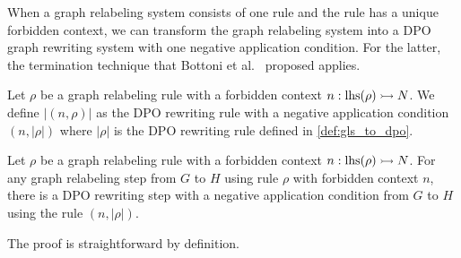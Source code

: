 When a graph relabeling system consists of one rule and the rule has a unique forbidden context, we can transform the graph relabeling system into a DPO graph rewriting system with one negative application condition. For the latter, the termination technique that Bottoni et al.~\cite{bottoni2010atermination} proposed applies. 
\begin{definition}
    Let $\rho$ be a graph relabeling rule with a forbidden context $n:\operatorname{lhs}(\rho) \rightarrowtail N$.
      We define $|(n,\rho)|$ as the DPO rewriting rule with a negative application condition $(n, |\rho|)$
    where $|\rho|$ is the DPO rewriting rule defined in \autoref{def:gls_to_dpo}.
\end{definition}  

\begin{theorem}
    \label{prop:fcgls_to_dpogrs_with_one_nac}
   Let $\rho$ be a graph relabeling rule with a forbidden context $n:\operatorname{lhs}(\rho) \rightarrowtail N$.
    For any graph relabeling step from $G$ to $H$ using rule $\rho$ with forbidden context $n$, there is a DPO rewriting step with a negative application condition from $G$ to $H$ using the rule $(n, |\rho|)$.
\end{theorem}
The proof is straightforward by definition.